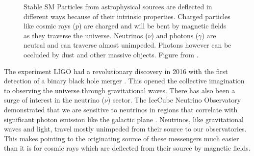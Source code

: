 \begin{figure}
    \caption{Stable SM Particles from astrophysical sources are deflected in different ways because of their intrinsic properties. Charged particles like cosmic rays ($p$) are charged and will be bent by magnetic fields as they traverse the universe. Neutrinos ($\nu$) and photons ($\gamma$) are neutral and can traverse almost unimpeded. Photons however can be occluded by dust and other massive objects. Figure from \cite{IceCube_SPGallery}.}
    \label{fig:astrophysics_particles}
\end{figure}

The experiment LIGO had a revolutionary discovery in 2016 with the first detection of a binary black hole merger \cite{2016:grav_waves}.
This opened the collective imagination to observing the universe through gravitational waves.
There has also been a surge of interest in the neutrino ($\nu$) sector.
The IceCube Neutrino Observatory demonstrated that we are sensitive to neutrinos in regions that correlate with significant photon emission like the galactic plane \cite{2023:IC3_galactic_plane}.
Neutrinos, like gravitational waves and light, travel mostly unimpeded from their source to our observatories.
This makes pointing to the originating source of these messengers much easier than it is for cosmic rays which are deflected from their source by magnetic fields.

